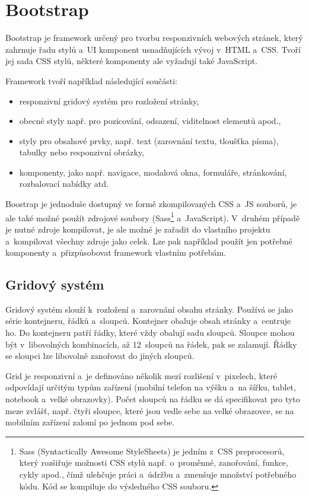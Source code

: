 \documentclass[
  digital, %
  oneside, %
  table,   %
  nolof,     %
  nolot,     %
]{fithesis3}
\begin{document}
\section{Bootstrap}
Bootstrap je framework určený pro tvorbu responzivních webových stránek, který zahrnuje řadu stylů a~UI komponent usnadňujících vývoj v~HTML a~CSS. Tvoří jej sada CSS stylů, některé komponenty ale vyžadují také JavaScript.\par
Framework tvoří například následující součásti: \cite{bootstrapcom}
\begin{itemize}
  \item responzivní gridový systém pro rozložení stránky,
  \item obecné styly např. pro pozicování, odsazení, viditelnost elementů apod.,
  \item styly pro obsahové prvky, např. text (zarovnání textu, tloušťka písma), tabulky nebo responzivní obrázky,
  \item komponenty, jako např. navigace, modalová okna, formuláře, stránkování, rozbalovací nabídky atd.
\end{itemize}
Boostrap je jednoduše dostupný ve formě zkompilovaných CSS a~JS souborů, je ale také možné použít zdrojové soubory (Sass\footnote{Sass (Syntactically Awesome StyleSheets) je jedním z~CSS preprocesorů, který rozšiřuje možnosti CSS stylů např. o~proměnné, zanořování, funkce, cykly apod., čímž ulehčuje práci a~údržbu a~zmenšuje množství potřebného kódu. Kód se kompiluje do výsledného CSS souboru.} a~JavaScript). V~druhém případě je nutné zdroje kompilovat, je ale možné je zařadit do vlastního projektu a~kompilovat všechny zdroje jako celek. Lze pak například použít jen potřebné komponenty a~přizpůsobovat framework vlastním potřebám.

\subsection{Gridový systém}
Gridový systém slouží k~rozložení a~zarovnání obsahu stránky. Používá se jako série kontejneru, řádků a~sloupců. \cite{bootstrapcom} Kontejner obaluje obsah stránky a~centruje ho. Do kontejneru patří řádky, které vždy obalují sadu sloupců. Sloupce mohou být v~libovolných kombinacích, až 12~sloupců na řádek, pak se zalamují. Řádky se sloupci lze libovolně zanořovat do jiných sloupců.\par
Grid je responzivní a~je definováno několik mezí rozlišení v~pixel\-ech, které odpovídají určitým typům zařízení (mobilní telefon na výšku a~na šířku, tablet, notebook a~velké obrazovky). Počet sloupců na řádku se dá specifikovat pro tyto meze zvlášť, např. čtyři sloupce, které jsou vedle sebe na velké obrazovce, se na mobilním zařízení zalomí po jednom pod sebe.
\end{document}
